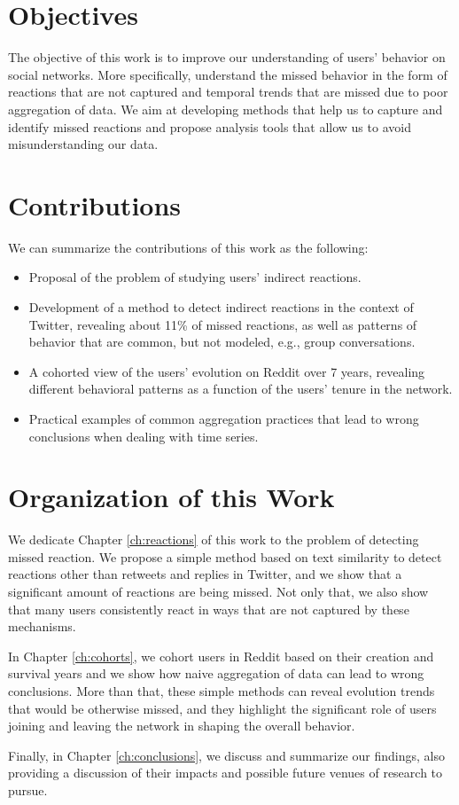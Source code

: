 \section{Objectives}

The objective of this work is to improve our understanding of users' behavior on social networks. More specifically, understand the missed behavior in the form of reactions that are not captured and temporal trends that are missed due to poor aggregation of data. We aim at developing methods that help us to capture and identify missed reactions and propose analysis tools that allow us to avoid misunderstanding our data.

\section{Contributions}

We can summarize the contributions of this work as the following:

\begin{itemize}
	\item Proposal of the problem of studying users' indirect reactions.
	\item Development of a method to detect indirect reactions in the context of Twitter, revealing about 11\% of missed reactions, as well as patterns of behavior that are common, but not modeled, e.g., group conversations.
	\item A cohorted view of the users' evolution on Reddit over 7 years, revealing different behavioral patterns as a function of the users' tenure in the network.
	\item Practical examples of common aggregation practices that lead to wrong conclusions when dealing with time series.
\end{itemize}


\section{Organization of this Work}

We dedicate Chapter \ref{ch:reactions} of this work to the problem of detecting missed reaction. We propose a simple method based on text similarity to detect reactions other than retweets and replies in Twitter, and we show that a significant amount of reactions are being missed. Not only that, we also show that many users consistently react in ways that are not captured by these mechanisms.

In Chapter \ref{ch:cohorts}, we cohort users in Reddit based on their creation and survival years and we show how naive aggregation of data can lead to wrong conclusions. More than that, these simple methods can reveal evolution trends that would be otherwise missed, and they highlight the significant role of users joining and leaving the network in shaping the overall behavior.

Finally, in Chapter \ref{ch:conclusions}, we discuss and summarize our findings, also providing a discussion of their impacts and possible future venues of research to pursue.